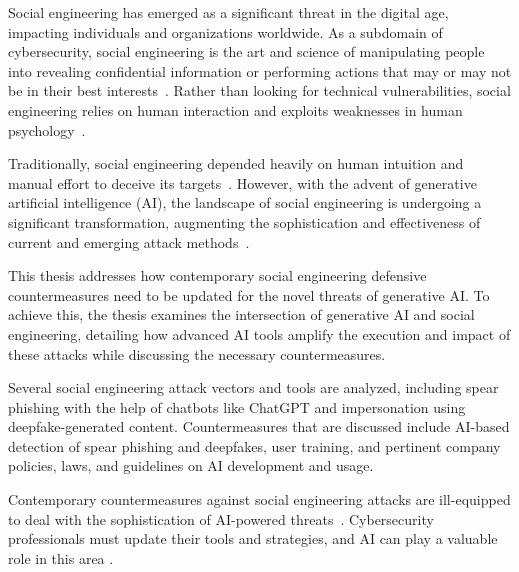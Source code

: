 %
%
Social engineering has emerged as a significant threat in the digital age, impacting individuals and organizations worldwide. As a subdomain of cybersecurity, social engineering is the art and science of manipulating people into revealing confidential information or performing actions that may or may not be in their best interests~\citep {hadnagySocialEngineering2018}. Rather than looking for technical vulnerabilities, social engineering relies on human interaction and exploits weaknesses in human psychology~\citep{wangDefiningSocialEngineering2020}.





%
%
Traditionally, social engineering depended heavily on human intuition and manual effort to deceive its targets~\citep{mitnick_The_Art_of_Deception_2003}. However, with the advent of generative artificial intelligence (AI), the landscape of social engineering is undergoing a  significant transformation, augmenting the sophistication and effectiveness of current and emerging attack methods~\citep{fakhouriAIDrivenSolutionsForSocialEngineeringAttacks2024}.





%
%
This thesis addresses how contemporary social engineering defensive countermeasures need to be updated for the novel threats of generative AI. To achieve this, the thesis examines the intersection of generative AI and social engineering, detailing how advanced AI tools amplify the execution and impact of these attacks while discussing the necessary countermeasures.





%
%
Several social engineering attack vectors and tools are analyzed, including spear phishing with the help of chatbots like ChatGPT and impersonation using deepfake-generated content. Countermeasures that are discussed include AI-based detection of spear phishing and deepfakes, user training, and pertinent company policies, laws, and guidelines on AI development and usage.





%
%
Contemporary countermeasures against social engineering attacks are ill-equipped to deal with the sophistication of AI-powered threats~\citep{fakhouriAIDrivenSolutionsForSocialEngineeringAttacks2024, blauth_AI_Crime_Overview_Malicious_Use_Abuse_2022}. Cybersecurity professionals must update their tools and strategies, and AI can play a valuable role in this area \citep{tsinganosTowardsAnAutomatedRecognitionSystem2018}.





